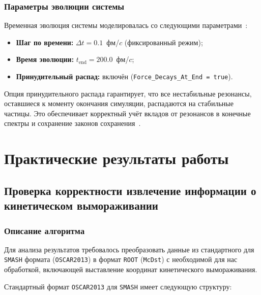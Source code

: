 \documentclass{extarticle}
\begin{document}
        \subsubsection{Параметры эволюции системы}
            Временная эволюция системы моделировалась 
            со следующими параметрами~\cite{Weil:2016zrk}:
            \begin{itemize}
                \item \textbf{Шаг по времени:} 
                    $\Delta t = 0.1$~фм/$c$ (фиксированный режим);
                \item \textbf{Время эволюции:} 
                    $t_{\text{end}} = 200.0$~фм/$c$;
                \item \textbf{Принудительный распад:} 
                    включён (\texttt{Force\_Decays\_At\_End = true}).
            \end{itemize}

            Опция принудительного распада гарантирует, что все нестабильные резонансы, 
            оставшиеся к моменту окончания симуляции, распадаются на стабильные частицы. 
            Это обеспечивает корректный учёт вкладов от резонансов 
            в конечные спектры и сохранение законов сохранения~\cite{Weil:2016zrk}.

\section{Практические результаты работы}
    \subsection{Проверка корректности извлечение информации о кинетическом вымораживании}

        \subsubsection{Описание алгоритма}
            Для анализа результатов требовалось преобразовать данные 
            из стандартного для \texttt{SMASH} формата (\texttt{OSCAR2013}) 
            в формат \texttt{ROOT} (\texttt{McDst}) с необходимой для нас обработкой, 
            включающей выставление координат кинетического вымораживания.

            Стандартный формат \texttt{OSCAR2013} для \texttt{SMASH} имеет следующую структуру:
\end{document}

